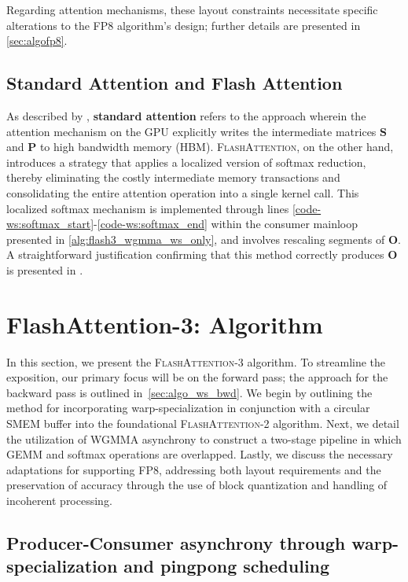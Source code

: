 Regarding attention mechanisms, these layout constraints necessitate specific alterations to the FP8 algorithm’s design; further details are presented in \cref{sec:algofp8}.

\subsection{Standard Attention and Flash Attention} As described by \citet{dao2022flashattention}, \textbf{standard attention} refers to the approach wherein the attention mechanism on the GPU explicitly writes the intermediate matrices $\mathbf{S}$ and $\mathbf{P}$ to high bandwidth memory (HBM). \textsc{FlashAttention}, on the other hand, introduces a strategy that applies a localized version of softmax reduction, thereby eliminating the costly intermediate memory transactions and consolidating the entire attention operation into a single kernel call. This localized softmax mechanism is implemented through lines \ref{code-ws:softmax_start}-\ref{code-ws:softmax_end} within the consumer mainloop presented in \cref{alg:flash3_wgmma_ws_only}, and involves rescaling segments of $\mathbf{O}$. A straightforward justification confirming that this method correctly produces $\mathbf{O}$ is presented in \cite[\S 2.3.1]{dao2023flashattention2}.

\section{FlashAttention-3: Algorithm}
\label{sec:algo}

In this section, we present the \textsc{FlashAttention-3} algorithm. To streamline the exposition, our primary focus will be on the forward pass; the approach for the backward pass is outlined in~\cref{sec:algo_ws_bwd}. We begin by outlining the method for incorporating warp-specialization in conjunction with a circular SMEM buffer into the foundational \textsc{FlashAttention-2} algorithm. Next, we detail the utilization of WGMMA asynchrony to construct a two-stage pipeline in which GEMM and softmax operations are overlapped. Lastly, we discuss the necessary adaptations for supporting FP8, addressing both layout requirements and the preservation of accuracy through the use of block quantization and handling of incoherent processing.

\subsection{Producer-Consumer asynchrony through warp-specialization and pingpong scheduling}
\label{sec:algo_ws}

